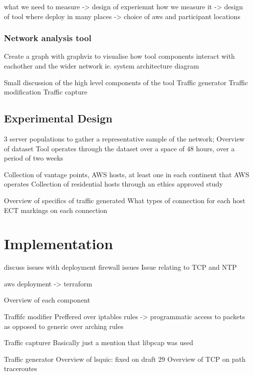 \documentclass{l4proj}
\begin{document}
what we need to measure -> design of experiemnt
how we measure it -> design of tool
where deploy in many places -> choice of aws and participant locations

\subsection{Network analysis tool}
{{Create a graph with graphviz to visualise how tool components interact with eachother and the wider network ie. system architecture diagram}}

{{Small discussion of the high level components of the tool}}
{{Traffic generator}}
{{Traffic modification}}
{{Traffic capture}}

\section{Experimental Design}

{{3 server populations to gather a representative sample of the network; Overview of dataset}}
{{Tool operates through the dataset over a space of 48 hours, over a period of two weeks}}


{{Collection of vantage points, AWS hosts, at least one in each continent that AWS operates}}
{{Collection of residential hosts through an ethics approved study}}


{{Overview of specifics of traffic generated}}
{{What types of connection for each host}}
{{ECT markings on each connection}}


\chapter{Implementation}

discuss issues with deployment
firewall issues
Issue relating to TCP and NTP

aws deployment -> terraform

{{Overview of each component}}

{{Traffifc modifier}}
{{Preffered over iptables rules -> programmatic access to packets as opposed to generic over arching rules}}

{{Traffic capturer}}
{{Basically just a mention that libpcap was used}}

{{Traffic generator}}
{{Overview of lsquic: fixed on draft 29}}
{{Overview of TCP on path traceroutes}}
\end{document}
